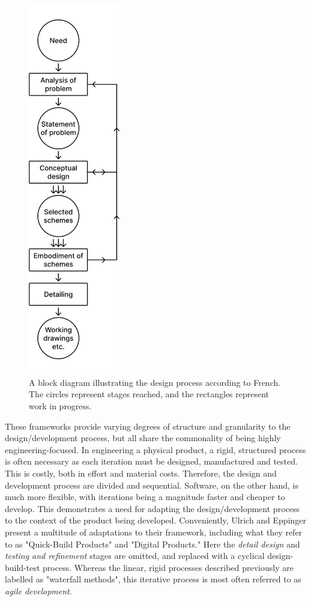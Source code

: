 \begin{figure}[H]
  \centering
  \includegraphics[width=4cm]{Pictures/Figures/french.png}
  \caption{A block diagram illustrating the design process according to French. The circles represent stages reached, and the rectangles represent work in progress.}
  \label{fig:french}
\end{figure}

These frameworks provide varying degrees of structure and granularity to the design/development process, but all share the commonality of being highly engineering-focused. In engineering a physical product, a rigid, structured process is often necessary as each iteration must be designed, manufactured and tested. This is costly, both in effort and material costs. Therefore, the design and development process are divided and sequential. Software, on the other hand, is much more flexible, with iterations being a magnitude faster and cheaper to develop. This demonstrates a need for adapting the design/development process to the context of the product being developed. Conveniently, Ulrich and Eppinger present a multitude of adaptations to their framework, including what they refer to as "Quick-Build Products" and "Digital Products." Here the \textit{detail design} and \textit{testing and refinement} stages are omitted, and replaced with a cyclical design-build-test process. Whereas the linear, rigid processes described previously are labelled as "waterfall methods", this iterative process is most often referred to as \textit{agile development}.

